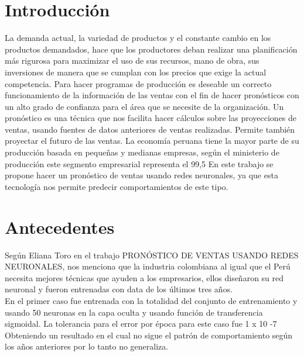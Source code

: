 \documentclass[conference]{IEEEtran}
\begin{document}
\section{Introducción}
La demanda actual, la variedad de productos y el constante cambio en los productos demandados, hace que los productores deban realizar una planificación más rigurosa para maximizar el uso de sus recursos, mano de obra, sus inversiones de manera que se cumplan con los precios que exige la actual competencia. Para hacer programas de producción es deseable un correcto funcionamiento de la información de las ventas con el fin de hacer pronósticos con un alto grado de confianza para el área que se necesite de la organización.
Un pronóstico es una técnica que nos facilita hacer cálculos sobre las proyecciones de ventas, usando fuentes de datos anteriores de ventas realizadas. Permite también proyectar el futuro de las ventas.
La economía peruana tiene la mayor parte de su producción basada en pequeñas y medianas empresas, según el ministerio de producción este segmento empresarial representa el 99,5%
En este trabajo se propone hacer un pronóstico de ventas usando redes neuronales, ya que esta tecnología nos permite predecir comportamientos de este tipo.


\section{Antecedentes}

Según Eliana Toro en el trabajo PRONÓSTICO DE VENTAS USANDO REDES NEURONALES, nos menciona que la industria colombiana al igual que el Perú necesita mejores técnicas que ayuden a los empresarios, ellos diseñaron su red neuronal y fueron entrenadas con data de los últimos tres años.\\En el primer caso fue entrenada con la totalidad del conjunto de entrenamiento y usando 50 neuronas en la capa oculta y usando       función       de       transferencia       sigmoidal.
La tolerancia para el error por época para este caso fue 1 x 10 -7 
Obteniendo un resultado en el cual no sigue el patrón de comportamiento según los años anteriores por lo tanto no generaliza.\\
\end{document}
